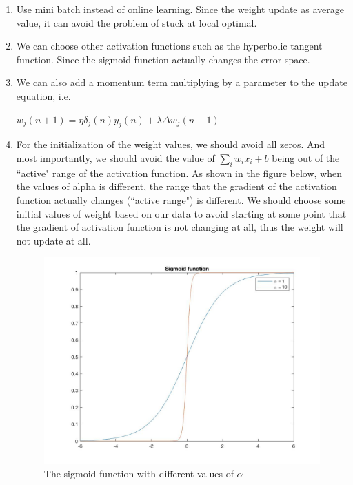 \documentclass[a4paper]{article}
\begin{document}
\begin{spacing}{2.0}
\begin{itemize}
\begin{enumerate}
\item Use mini batch instead of online learning. Since the weight update as average value, it can avoid the problem of stuck at local optimal.

\item We can choose other activation functions such as the hyperbolic tangent function. Since the sigmoid function actually changes the error space. 

\item We can also add a momentum term multiplying by a parameter to the update equation, i.e.\\
\begin{center} $w_j(n+1) = \eta \delta_j(n)y_j(n) + \lambda \Delta w_j(n-1)$ \end{center}

\item For the initialization of the weight values, we should avoid all zeros. And most importantly, we should avoid the value of $\sum_{i}w_ix_i+b$ being out of the ``active" range of the activation function. As shown in the figure below, when the values of alpha is different, the range that the gradient of the activation function actually changes (``active range") is different. We should choose some initial values of weight based on our data to avoid starting at some point that the gradient of activation function is not changing at all, thus the weight will not update at all.

\begin{figure}[H]
\centering
\includegraphics[width = 4.5in]{sigmoid.jpg}
\caption{The sigmoid function with different values of $\alpha$}
\label{sigmoid}
\end{figure}


\end{enumerate}
\end{itemize}
\end{spacing}
\end{document}
